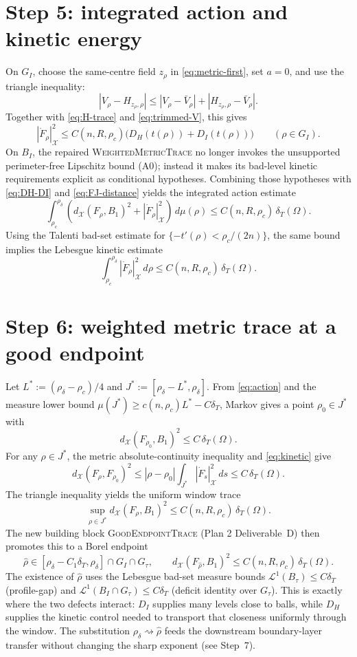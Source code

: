 \documentclass[11pt]{article}
\theoremstyle{definition}
\newcommand{\Om}{\Omega}
\newcommand{\X}{\mathcal X}
\newcommand{\rdel}{\rho_\delta}
\newcommand{\rhad}{\widehat\rho}
\begin{document}
\section{Step 5: integrated action and kinetic energy}

On $G_I$, choose the same-centre field $z_\rho$ in
\eqref{eq:metric-first}, set $a=0$, and use the triangle inequality:
\[
  |V_\rho-H_{z_\rho,\rho}|
  \le |V_\rho-\bar V_\rho|+|H_{z_\rho,\rho}-\bar V_\rho|.
\]
Together with \eqref{eq:H-trace} and \eqref{eq:trimmed-V}, this gives
\begin{equation}\label{eq:metric-derivative-good}
  |\dot F_\rho|_\X^2
  \le C(n,R,\rho_c)\bigl(D_H(t(\rho))+D_I(t(\rho))\bigr)
  \qquad(\rho\in G_I).
\end{equation}
On $B_I$, the repaired \textsc{WeightedMetricTrace} no longer invokes
the unsupported perimeter-free Lipschitz bound (A0); instead it makes
its bad-level kinetic requirements explicit as conditional hypotheses.
Combining those hypotheses with \eqref{eq:DH-DI} and
\eqref{eq:FJ-distance} yields the integrated action estimate
\begin{equation}\label{eq:action}
  \int_{\rho_c}^{\rdel}
  \left(d_\X(F_\rho,B_1)^2+|\dot F_\rho|_\X^2\right)\,d\mu(\rho)
  \le C(n,R,\rho_c)\,\delta_T(\Om).
\end{equation}
Using the Talenti bad-set estimate for
$\{-t'(\rho)<\rho_c/(2n)\}$, the same bound implies the Lebesgue
kinetic estimate
\begin{equation}\label{eq:kinetic}
  \int_{\rho_c}^{\rdel}|\dot F_\rho|_\X^2\,d\rho
  \le C(n,R,\rho_c)\,\delta_T(\Om).
\end{equation}

\section{Step 6: weighted metric trace at a good endpoint}

Let $L^*:=(\rdel-\rho_c)/4$ and
$J^*:=[\rdel-L^*,\rdel]$.  From \eqref{eq:action} and the measure
lower bound $\mu(J^*)\ge c(n,\rho_c)L^*-C\delta_T$, Markov gives a
point $\rho_0\in J^*$ with
\[
  d_\X(F_{\rho_0},B_1)^2\le C\,\delta_T(\Om).
\]
For any $\rho\in J^*$, the metric absolute-continuity inequality and
\eqref{eq:kinetic} give
\[
  d_\X(F_\rho,F_{\rho_0})^2
  \le |\rho-\rho_0|\int_{J^*}|\dot F_s|_\X^2\,ds
  \le C\,\delta_T(\Om).
\]
The triangle inequality yields the uniform window trace
\[
  \sup_{\rho\in J^*}d_\X(F_\rho,B_1)^2\le C(n,R,\rho_c)\,\delta_T(\Om).
\]
The new building block \textsc{GoodEndpointTrace} (Plan 2
Deliverable~D) then promotes this to a Borel endpoint
\[
  \rhad\in[\rdel-C_1\delta_T,\rdel]\cap G_I\cap G_\tau,
  \qquad
  d_\X(F_{\rhad},B_1)^2\le C(n,R,\rho_c)\,\delta_T(\Om).
\]
The existence of $\rhad$ uses the Lebesgue bad-set measure bounds
$\mathcal L^1(B_\tau)\le C\delta_T$ (profile-gap) and
$\mathcal L^1(B_I\cap G_\tau)\le C\delta_T$ (deficit identity over
$G_\tau$).
This is exactly where the two defects interact: $D_I$ supplies many
levels close to balls, while $D_H$ supplies the kinetic control needed
to transport that closeness uniformly through the window.  The
substitution $\rdel\rightsquigarrow\rhad$ feeds the downstream
boundary-layer transfer without changing the sharp exponent (see
Step~7).
\end{document}
